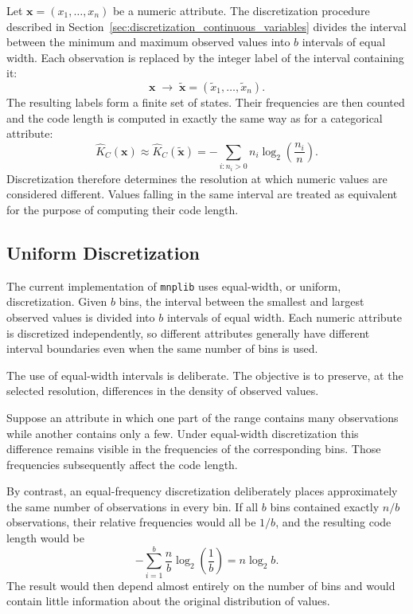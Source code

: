 Let $\mathbf{x}=(x_1,\ldots,x_n)$ be a numeric attribute. The discretization procedure described in Section~\ref{sec:discretization_continuous_variables} divides the interval between the minimum and maximum observed values into $b$ intervals of equal width. Each observation is replaced by the integer label of the interval containing it:
$$
\mathbf{x} \; \longrightarrow\; \tilde{\mathbf{x}} = (\tilde{x}_1,\ldots,\tilde{x}_n).
$$
The resulting labels form a finite set of states. Their frequencies are then counted and the code length is computed in exactly the same way as for a categorical attribute:
$$
\hat{K}_C(\mathbf{x}) \approx \hat{K}_C(\tilde{\mathbf{x}}) =
-\sum_{i:n_i>0} n_i \log_2 \left(\frac{n_i}{n}\right).
$$
Discretization therefore determines the resolution at which numeric values are considered different. Values falling in the same interval are treated as equivalent for the purpose of computing their code length.

\subsection*{Uniform Discretization}

The current implementation of \texttt{mnplib} uses equal-width, or uniform, discretization. Given $b$ bins, the interval between the smallest and largest observed values is divided into $b$ intervals of equal width. Each numeric attribute is discretized independently, so different attributes generally have different interval boundaries even when the same number of bins is used.

The use of equal-width intervals is deliberate. The objective is to preserve, at the selected resolution, differences in the density of observed values.

\begin{example}
Suppose an attribute in which one part of the range contains many observations while another contains only a few. Under equal-width discretization this difference remains visible in the frequencies of the corresponding bins. Those frequencies subsequently affect the code length.

By contrast, an equal-frequency discretization deliberately places approximately the same number of observations in every bin. If all $b$ bins contained exactly $n/b$ observations, their relative frequencies would all be $1/b$, and the resulting code length would be
$$
-\sum_{i=1}^{b} \frac{n}{b} \log_2\left(\frac{1}{b}\right) = n\log_2 b.
$$
The result would then depend almost entirely on the number of bins and would contain little information about the original distribution of values.
\end{example}

